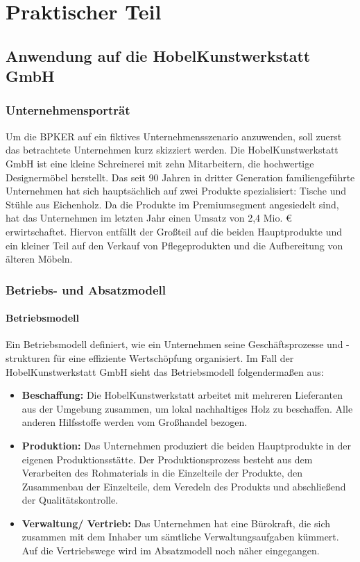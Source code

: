 \chapter{Praktischer Teil}


\section{Anwendung auf die HobelKunstwerkstatt GmbH}

\subsection{Unternehmensporträt}

Um die BPKER auf ein fiktives Unternehmensszenario anzuwenden, soll zuerst das betrachtete Unternehmen kurz skizziert werden. Die HobelKunstwerkstatt GmbH ist eine kleine Schreinerei mit zehn Mitarbeitern, die hochwertige Designermöbel herstellt. Das seit 90 Jahren in dritter Generation familiengeführte Unternehmen hat sich hauptsächlich auf zwei Produkte spezialisiert: Tische und Stühle aus Eichenholz. Da die Produkte im Premiumsegment angesiedelt sind, hat das Unternehmen im letzten Jahr einen Umsatz von 2,4 Mio. {\euro} erwirtschaftet. Hiervon entfällt der Großteil auf die beiden Hauptprodukte und ein kleiner Teil auf den Verkauf von Pflegeprodukten und die Aufbereitung von älteren Möbeln.

\subsection{Betriebs- und Absatzmodell}

\subsubsection{Betriebsmodell}

Ein Betriebsmodell definiert, wie ein Unternehmen seine Geschäftsprozesse und -strukturen für eine effiziente Wertschöpfung organisiert. Im Fall der HobelKunstwerkstatt GmbH sieht das Betriebsmodell folgendermaßen aus:

\begin{itemize}
    \item \textbf{Beschaffung:} Die HobelKunstwerkstatt arbeitet mit mehreren Lieferanten aus der Umgebung zusammen, um lokal nachhaltiges Holz zu beschaffen. Alle anderen Hilfsstoffe werden vom Großhandel bezogen. 
    \item \textbf{Produktion:} Das Unternehmen produziert die beiden Hauptprodukte in der eigenen Produktionsstätte. Der Produktionsprozess besteht aus dem Verarbeiten des Rohmaterials in die Einzelteile der Produkte, den Zusammenbau der Einzelteile, dem Veredeln des Produkts und abschließend der Qualitätskontrolle.
    \item \textbf{Verwaltung/ Vertrieb:} Das Unternehmen hat eine Bürokraft, die sich zusammen mit dem Inhaber um sämtliche Verwaltungsaufgaben kümmert. Auf die Vertriebswege wird im Absatzmodell noch näher eingegangen.
\end{itemize}

